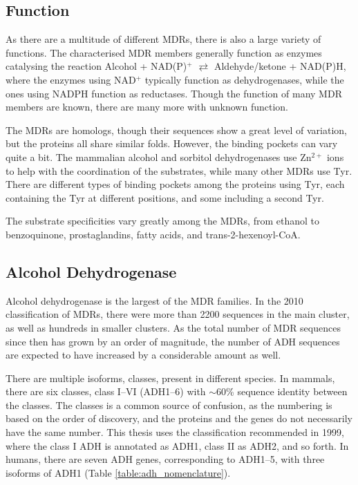 \documentclass[a4paper, twoside, 12pt, openright]{report}
\begin{document}
\subsection{Function}

As there are a multitude of different MDRs, there is also a large variety of functions. The characterised MDR members generally function as enzymes catalysing the reaction Alcohol + NAD(P)$^+$ $\rightleftarrows$ Aldehyde/ketone + NAD(P)H, where the enzymes using NAD$^+$  typically function as dehydrogenases, while the ones using NADPH function as reductases\cite{persson_medium-_2008}. Though the function of many MDR members are known, there are many more with unknown function.

The MDRs are homologs, though their sequences show a great level of variation, but the proteins all share similar folds. However, the binding pockets can vary quite a bit. The mammalian alcohol and sorbitol dehydrogenases use Zn$^{2+}$ ions to help with the coordination of the substrates\cite{jornvall_alcohol_1981}, while many other MDRs use Tyr\cite{porte_three-dimensional_2009}. There are different types of binding pockets among the proteins using Tyr, each containing the Tyr at different positions, and some including a second Tyr.

The substrate specificities vary greatly among the MDRs, from ethanol\cite{hoog_mammalian_2001-1} to benzoquinone\cite{hoog_mammalian_2001-1}, prostaglandins\cite{wu_structural_2008}, fatty acids\cite{jayakumar_human_1995}, and trans-2-hexenoyl-CoA\cite{miinalainen_characterization_2003}.


\subsection{Alcohol Dehydrogenase}
\label{sec:adh}

Alcohol dehydrogenase is the largest of the MDR families. In the 2010 classification of MDRs\cite{hedlund_subdivision_2010}, there were more than 2200 sequences in the main cluster, as well as hundreds in smaller clusters. As the total number of MDR sequences since then has grown by an order of magnitude, the number of ADH sequences are expected to have increased by a considerable amount as well.

There are multiple isoforms, classes, present in different species. In mammals, there are six classes, class I--VI (ADH1--6) with $\sim$60\% sequence identity between the classes. The classes is a common source of confusion, as the numbering is based on the order of discovery, and the proteins and the genes do not necessarily have the same number. This thesis uses the classification recommended in 1999\cite{duester_recommended_1999}, where the class I ADH is annotated as ADH1, class II as ADH2, and so forth. In humans, there are seven ADH genes, corresponding to ADH1--5\cite{hoog_mammalian_2001-1, jornvall_alcohol_2015}, with three isoforms of ADH1\cite{vallee_isozymes_1983} (Table \ref{table:adh_nomenclature}).
\end{document}
